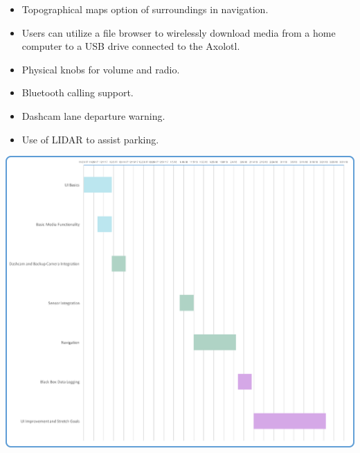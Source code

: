 \documentclass[onecolumn, draftclsnofoot,10pt, compsoc]{IEEEtran}
\begin{document}
\begin{itemize}
\begin{itemize}
\item Topographical maps option of surroundings in navigation.
\item Users can utilize a file browser to wirelessly download media from a home computer to a USB drive connected to the Axolotl.
\item Physical knobs for volume and radio.
\item Bluetooth calling support.
\item Dashcam lane departure warning.
\item Use of LIDAR to assist parking.
\end{itemize}
\end{itemize}
\includegraphics{gantt}
\end{document}
